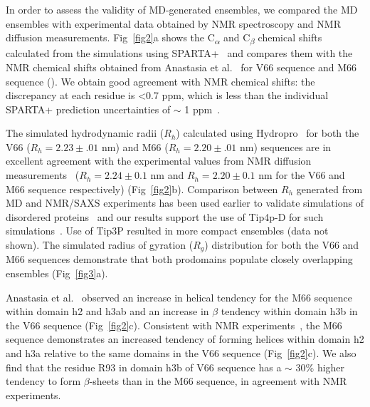 \documentclass[10pt,letterpaper]{article}
\begin{document}
In order to assess the validity of MD-generated ensembles, we compared the MD ensembles with experimental data obtained by NMR spectroscopy and NMR diffusion measurements. Fig~\ref{fig2}a shows the C\textsubscript{$\alpha$} and C\textsubscript{$\beta$} chemical shifts calculated from the simulations using SPARTA+~\cite{Shen2010} and compares them with the NMR chemical shifts obtained from Anastasia et al.~\cite{Anastasia2013} for V66 sequence and M66 sequence (). We obtain good agreement with NMR chemical shifts: the discrepancy at each residue is \textless 0.7 ppm, which is less than the individual SPARTA+ prediction uncertainties of $\sim$ 1 ppm~\cite{Shen2010}. 

The simulated hydrodynamic radii ($R_{h}$) calculated using Hydropro~\cite{Ortega2011} for both the V66 ($R_{h}=2.23 \pm 
 { .01}$ nm) and M66 ($R_{h}=2.20 \pm { .01}$ nm) sequences are in excellent agreement with the experimental values from NMR diffusion measurements~\cite{Anastasia2013} ($R_{h}=2.24 \pm { 0.1}$ nm and $R_{h}=2.20\pm {0.1}$ nm for the V66 and M66 sequence respectively) (Fig~\ref{fig2}b). Comparison between $R_h$ generated from MD and NMR/SAXS experiments has been used earlier to validate simulations of disordered proteins~\cite{Mercadante2015, Rauscher2015, Meng2018} and our results support the use of Tip4p-D for such simulations~\cite{Piana2015, Robustelli2018}. Use of Tip3P resulted in more compact ensembles (data not shown). The simulated radius of gyration ($R_g$) distribution for both the V66 and M66 sequences demonstrate that both prodomains populate closely overlapping ensembles (Fig~\ref{fig3}a).  

Anastasia et al.~\cite{Anastasia2013} observed an increase in helical tendency for the M66 sequence within domain h2 and h3ab and an increase in $\beta$ tendency within domain h3b in the V66 sequence (Fig~\ref{fig2}c). Consistent with NMR experiments~\cite{Anastasia2013}, the M66 sequence demonstrates an increased tendency of forming helices within domain h2 and h3a relative to the same domains in the V66 sequence (Fig~\ref{fig2}c). We also find that the residue R93 in domain h3b of V66 sequence has a $\sim$ 30\% higher tendency to form $\beta$-sheets than in the M66 sequence, in agreement with NMR experiments.
 
\end{document}
